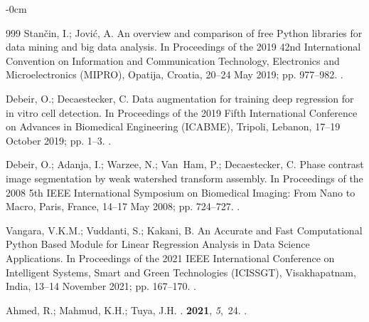 \documentclass[jimaging,article,accept,pdftex,moreauthors]{Definitions/mdpi}
\begin{document}
\begin{adjustwidth}{-\extralength}{0cm}
\begin{thebibliography}{999}
Stančin, I.; Jović, A.
\newblock An overview and comparison of free Python libraries for data mining
  and big data analysis.
\newblock In Proceedings of the 2019 42nd International Convention on
  Information and Communication Technology, Electronics and Microelectronics
  (MIPRO), Opatija, Croatia, 20--24 May 2019; pp. 977--982. %
.

Debeir, O.; Decaestecker, C.
\newblock Data augmentation for training deep regression for in vitro cell
  detection.
\newblock In Proceedings of the 2019 Fifth International Conference on Advances
  in Biomedical Engineering (ICABME), Tripoli, Lebanon, 17--19 October 2019; pp. 1--3.
. %

Debeir, O.; Adanja, I.; Warzee, N.; Van~Ham, P.; Decaestecker, C.
\newblock Phase contrast image segmentation by weak watershed transform
  assembly.
\newblock In Proceedings of the 2008 5th IEEE International Symposium on
  Biomedical Imaging: From Nano to Macro, Paris, France, 14--17 May 2008; pp. 724--727.
. %

Vangara, V.K.M.; Vuddanti, S.; Kakani, B.
\newblock An Accurate and Fast Computational Python Based Module for Linear
  Regression Analysis in Data Science Applications.
\newblock In Proceedings of the 2021 IEEE International Conference on
  Intelligent Systems, Smart and Green Technologies (ICISSGT), Visakhapatnam, India, 13--14 November 2021; pp.
  167--170.
. %

Ahmed, R.; Mahmud, K.H.; Tuya, J.H.
.
 {\bf 2021},
  {\em 5},~24.
.


\end{thebibliography}
\end{adjustwidth}
\end{document}
